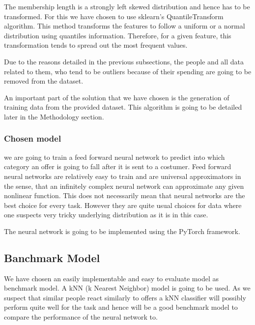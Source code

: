 The membership length is a strongly left skewed distribution and hence has to be transformed. For this we have chosen to use sklearn's QuantileTransform algorithm. This method transforms the features to follow a uniform or a normal distribution using quantiles information. Therefore, for a given feature, this transformation tends to spread out the most frequent values.

Due to the reasons detailed in the previous subsections, the people and all data related to them, who tend to be outliers because of their spending are going to be removed from the dataset.

An important part of the solution that we have chosen is the generation of training data from the provided dataset. This algorithm is going to be detailed later in the Methodology section.

\subsubsection{Chosen model}

we are going to train a feed forward neural network to predict into which category an offer is going to fall after it is sent to a costumer. Feed forward neural networks are relatively easy to train and are universal approximators in the sense, that an infinitely complex neural network can approximate any given nonlinear function. This does not necessarily mean that neural networks are the best choice for every task. However they are quite usual choices for data where one suspects very tricky underlying distribution as it is in this case. 

The neural network is going to be implemented using the PyTorch framework.

\subsection{Banchmark Model}\label{sec2.4}

We have chosen an easily implementable and easy to evaluate model as benchmark model. A kNN (k Nearest Neighbor) model is going to be used. As we suspect that similar people react similarly to offers a kNN classifier will possibly perform quite well for the task and hence will be a good benchmark model to compare the performance of the neural network to.



